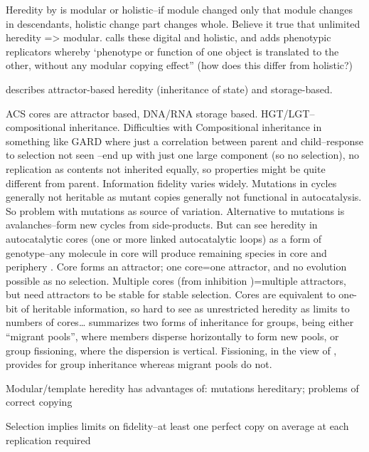 Heredity by \cite{MaynardSmith1999} is modular or holistic--if module changed only that module changes in descendants, holistic change part changes whole. Believe it true that unlimited heredity => modular. \cite{Szathmary1999} calls these digital and holistic, and adds phenotypic replicators whereby ‘phenotype or function of one object is translated to the other, without any modular copying effect” (how does this differ from holistic?)

\cite{Hogeweg1997} describes attractor-based heredity (inheritance of state) and storage-based. 

\cite{Vasas2012a} ACS cores are attractor based, DNA/RNA storage based. HGT/LGT--compositional inheritance.
Difficulties with Compositional inheritance in something like GARD where just a correlation between parent and child--response to selection not seen \parencite{Vasas2015}--end up with just one large component (so no selection), no replication as contents not inherited equally, so properties might be quite different from parent. Information fidelity varies widely. Mutations in cycles \parencite{Vasas2012a} generally not heritable as mutant copies generally not functional in autocatalysis. So problem with mutations as source of variation. Alternative to mutations is avalanches--form new cycles from side-products.
But can see heredity in autocatalytic cores (one or more linked autocatalytic loops) as a form of genotype--any molecule in core will produce remaining species in core and periphery \parencite{Vasas2012a}. Core forms an attractor; one core=one attractor, and no evolution possible as no selection. Multiple cores (from inhibition \cite{Vasas2012a})=multiple attractors, but need attractors to be stable for stable selection. Cores are equivalent to one-bit of heritable information, so hard to see as unrestricted heredity as limits to numbers of cores…
\cite{Watson2015} summarizes two forms of inheritance for groups, being either ``migrant pools'', where members disperse horizontally to form new pools, or group fissioning, where the dispersion is vertical. Fissioning, in the view of \cite{Watson2015}, provides for group inheritance whereas migrant pools do not.

Modular/template heredity has advantages of: mutations hereditary; problems of correct copying \parencite{Eigen1977}

Selection implies limits on fidelity--at least one perfect copy on average at each replication required \parencite{Eigen1977}



